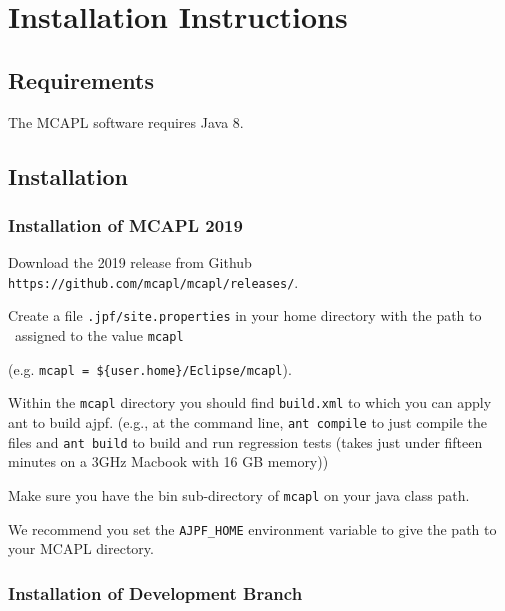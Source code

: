 \chapter{Installation Instructions}
\label{chap:installation}
\section{Requirements}

The MCAPL software requires Java 8.  

\section{Installation}

\subsection{Installation of MCAPL 2019}

\begin{itemize}
\begin{sloppypar}
\item Download the 2019 release from Github \texttt{https://github.com/mcapl/mcapl/releases/}.
\end{sloppypar}
\item Create a file \texttt{.jpf/site.properties} in your home directory with the path to \ajpfversion\ assigned to the value \texttt{mcapl}

  (e.g. \texttt{mcapl = \$\{user.home\}/Eclipse/mcapl}).
\item Within the \texttt{mcapl} directory you should find \texttt{build.xml} to which you can apply ant to build ajpf. (e.g., at the command line, \lstinline{ant compile} to just compile the files and \lstinline{ant build} to build and run regression tests (takes just under fifteen minutes on a 3GHz Macbook with 16 GB memory))
\item Make sure you have the bin sub-directory of \texttt{mcapl} on your java class path.
\item We recommend you set the \texttt{AJPF\_HOME} environment variable to give the path to your MCAPL directory.
\end{itemize}

\subsection{Installation of Development Branch}


